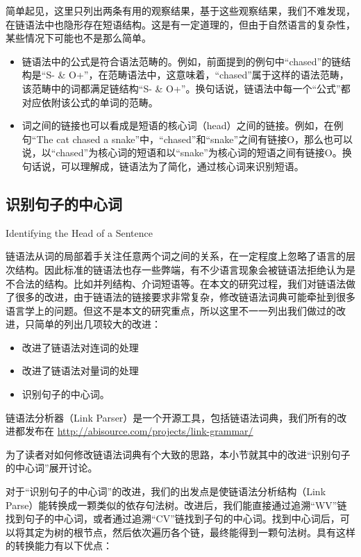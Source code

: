 简单起见，这里只列出两条有用的观察结果，基于这些观察结果，我们不难发现，在链语法中也隐形存在短语结构。这是有一定道理的，但由于自然语言的复杂性，某些情况下可能也不是那么简单。

\begin{itemize}
\item 链语法中的公式是符合语法范畴的。例如，前面提到的例句中“chased”的链结构是“S- \& O+”，在范畴语法中，这意味着，“chased”属于这样的语法范畴，该范畴中的词都满足链结构“S- \& O+”。换句话说，链语法中每一个“公式”都对应依附该公式的单词的范畴。 
\item 词之间的链接也可以看成是短语的核心词（head）之间的链接。例如，在例句“The cat chased a snake”中，“chased”和“snake”之间有链接O，那么也可以说，以“chased”为核心词的短语和以“snake”为核心词的短语之间有链接O。换句话说，可以理解成，链语法为了简化，通过核心词来识别短语。
\end{itemize}

\subsection{识别句子的中心词}{Identifying the Head of a Sentence}
\label{sec:head}

链语法从词的局部着手关注任意两个词之间的关系，在一定程度上忽略了语言的层次结构。因此标准的链语法也存一些弊端，有不少语言现象会被链语法拒绝认为是不合法的结构。比如并列结构、介词短语等。在本文的研究过程，我们对链语法做了很多的改进，由于链语法的链接要求非常复杂，修改链语法词典可能牵扯到很多语言学上的问题。但这不是本文的研究重点，所以这里不一一列出我们做过的改进，只简单的列出几项较大的改进：

\begin{itemize}
\item 改进了链语法对连词的处理
\item 改进了链语法对量词的处理
\item 识别句子的中心词。
\end{itemize}

链语法分析器（Link Parser）是一个开源工具，包括链语法词典，我们所有的改进都发布在 \url{http://abisource.com/projects/link-grammar/}

为了读者对如何修改链语法词典有个大致的思路，本小节就其中的改进“识别句子的中心词”展开讨论。

对于“识别句子的中心词”的改进，我们的出发点是使链语法分析结构（Link Parse）能转换成一颗类似的依存句法树。改进后，我们能直接通过追溯“WV”链找到句子的中心词，或者通过追溯“CV”链找到子句的中心词。找到中心词后，可以将其定为树的根节点，然后依次遍历各个链，最终能得到一颗句法树。具有这样的转换能力有以下优点：

